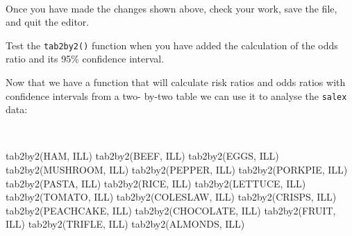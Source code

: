 \documentclass[
  12pt,
  a4paper]{book}
\newenvironment{Shaded}{\begin{snugshade}}{\end{snugshade}}
\newcommand{\FunctionTok}[1]{\textcolor[rgb]{0.00,0.00,0.00}{#1}}
\newcommand{\NormalTok}[1]{#1}
\newcommand{\SpecialCharTok}[1]{\textcolor[rgb]{0.00,0.00,0.00}{#1}}
\newcommand{\StringTok}[1]{\textcolor[rgb]{0.31,0.60,0.02}{#1}}
\begin{document}
\begin{Shaded}
\end{Shaded}

~

Once you have made the changes shown above, check your work, save the file, and quit the editor.

\newpage

Test the \texttt{tab2by2()} function when you have added the calculation of the odds ratio and its 95\% confidence interval.

Now that we have a function that will calculate risk ratios and odds ratios with confidence intervals from a two- by-two table we can use it to analyse the \texttt{salex} data:

~

\begin{Shaded}
\begin{Highlighting}[]
\FunctionTok{tab2by2}\NormalTok{(HAM, ILL)}
\FunctionTok{tab2by2}\NormalTok{(BEEF, ILL)}
\FunctionTok{tab2by2}\NormalTok{(EGGS, ILL)}
\FunctionTok{tab2by2}\NormalTok{(MUSHROOM, ILL)}
\FunctionTok{tab2by2}\NormalTok{(PEPPER, ILL)}
\FunctionTok{tab2by2}\NormalTok{(PORKPIE, ILL)}
\FunctionTok{tab2by2}\NormalTok{(PASTA, ILL)}
\FunctionTok{tab2by2}\NormalTok{(RICE, ILL)}
\FunctionTok{tab2by2}\NormalTok{(LETTUCE, ILL)}
\FunctionTok{tab2by2}\NormalTok{(TOMATO, ILL)}
\FunctionTok{tab2by2}\NormalTok{(COLESLAW, ILL)}
\FunctionTok{tab2by2}\NormalTok{(CRISPS, ILL)}
\FunctionTok{tab2by2}\NormalTok{(PEACHCAKE, ILL)}
\FunctionTok{tab2by2}\NormalTok{(CHOCOLATE, ILL)}
\FunctionTok{tab2by2}\NormalTok{(FRUIT, ILL)}
\FunctionTok{tab2by2}\NormalTok{(TRIFLE, ILL)}
\FunctionTok{tab2by2}\NormalTok{(ALMONDS, ILL)}
\end{Highlighting}
\end{Shaded}
\end{document}
